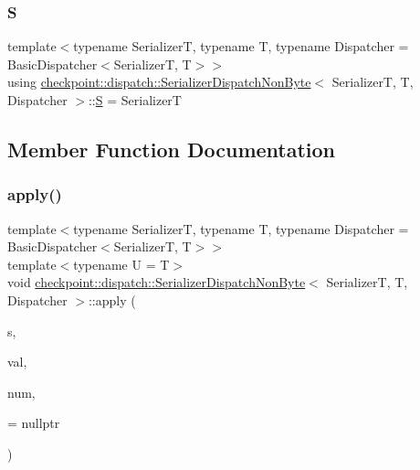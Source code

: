 \subsubsection{\texorpdfstring{S}{S}}
{\footnotesize\ttfamily template$<$typename SerializerT, typename T, typename Dispatcher = Basic\+Dispatcher$<$\+Serializer\+T, T$>$$>$ \\
using \hyperlink{structcheckpoint_1_1dispatch_1_1_serializer_dispatch_non_byte}{checkpoint\+::dispatch\+::\+Serializer\+Dispatch\+Non\+Byte}$<$ SerializerT, T, Dispatcher $>$\+::\hyperlink{structcheckpoint_1_1dispatch_1_1_serializer_dispatch_non_byte_a456d0c02fc35667989d79ddbb0393776}{S} =  SerializerT}



\subsection{Member Function Documentation}
\mbox{\label{structcheckpoint_1_1dispatch_1_1_serializer_dispatch_non_byte_a12e7e180be642ec9eaaac93972e28856}} 
\subsubsection{\texorpdfstring{apply()}{apply()}\hspace{0.1cm}{\footnotesize\ttfamily [1/2]}}
{\footnotesize\ttfamily template$<$typename SerializerT, typename T, typename Dispatcher = Basic\+Dispatcher$<$\+Serializer\+T, T$>$$>$ \\
template$<$typename U  = T$>$ \\
void \hyperlink{structcheckpoint_1_1dispatch_1_1_serializer_dispatch_non_byte}{checkpoint\+::dispatch\+::\+Serializer\+Dispatch\+Non\+Byte}$<$ SerializerT, T, Dispatcher $>$\+::apply (\begin{DoxyParamCaption}\item[{SerializerT \&}]{s,  }\item[{T $\ast$}]{val,  }\item[{\hyperlink{namespacecheckpoint_a083f6674da3f94c2901b18c6d238217c}{Serial\+Size\+Type}}]{num,  }\item[{has\+Virtual\+Serialize$<$ U $>$ $\ast$}]{ = {\ttfamily nullptr} }\end{DoxyParamCaption})\hspace{0.3cm}{\ttfamily [inline]}}

